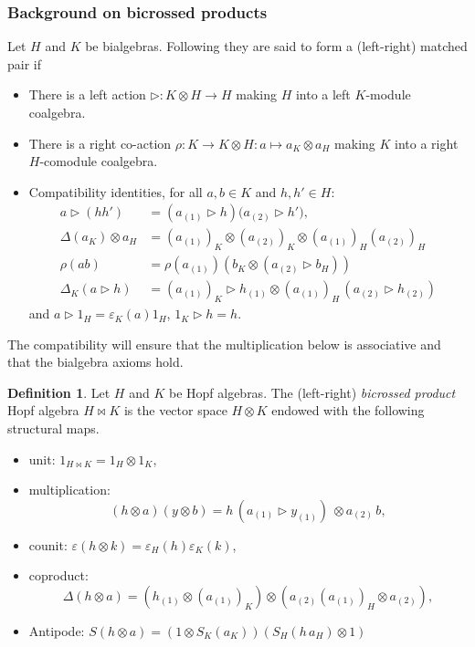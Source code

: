 \documentclass[a4paper,10pt]{amsart}
\theoremstyle{definition}
\newtheorem{definition}[lemma]{Definition}
\theoremstyle{remark}
\newcommand\D{\Delta}
\newcommand\eps{\varepsilon}
\newcommand\triangler{\triangleright}
\newcommand\ot{\otimes}
\begin{document}
\subsubsection{Background on bicrossed products}\label{subsecti bicrossed}

Let $H$ and $K$ be bialgebras. Following \cite{Takeuchi} they are said to form a (left-right) matched pair if
\begin{itemize}
\item There is a left action $\triangleright:K\otimes H\to H$ making $H$ into a left $K$-module coalgebra.\smallskip
    \item There is a right co-action $\rho:K \to K \ot H : a \mapsto a_K \ot a_H$ making $K$ into a right $H$-comodule coalgebra.\smallskip
\item Compatibility identities, for all $a,b\in K$ and $h,h'\in H$:
\begin{align*}
a\triangler (hh') &= (a_{(1)}\triangler h)\bigl( a_{(2)}\triangler h'\bigr),\\
\D(a_K) \ot a_H &= (a_{(1)})_K \ot (a_{(2)})_K \ot (a_{(1)})_{H}(a_{(2)})_{H} \\
\rho(ab) & = \rho(a_{(1)})(b_K \ot (a_{(2)}\triangler b_H)) \\
\D_K(a \triangler h) & = (a_{(1)})_K \triangler h_{(1)} \ot (a_{(1)})_H \, (a_{(2)} \triangler h_{(2)})
\end{align*}
and
$a\triangler 1_H=\eps_K(a)1_H$, $1_K\triangler h=h$.
\end{itemize}
The compatibility will ensure that the multiplication below is associative and that the bialgebra axioms hold.

\begin{definition}
Let $H$ and $K$ be Hopf algebras. The (left-right) \emph{bicrossed product} Hopf algebra $H\bowtie K$ is the vector space $H\otimes K$ endowed with the following structural maps.
\begin{itemize}
\item unit: $1_{H\bowtie K}=1_H\ot 1_K$,
\item multiplication:
\begin{equation*}
(h\otimes a)(y\otimes b)
=
h\,(a_{(1)}\triangler y_{(1)})\ \ot a_{(2)}\,b,
\end{equation*}
\item counit: $\eps (h\ot k)=\eps_H(h)\eps_K(k)$,
\item coproduct:
\[
\D(h\ot a)=(h_{(1)}\ot (a_{(1)})_K)\ot (a_{(2)}(a_{(1)})_H\ot a_{(2)}),
\]
\item Antipode: $S(h \ot a) = (1 \ot S_K(a_K)) (S_H(h\,a_H) \ot 1)$
\end{itemize}
\end{definition}
\end{document}
